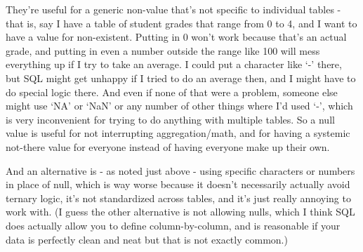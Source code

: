 \documentclass[11pt, oneside]{amsart}   	%
\begin{document}
They're useful for a generic non-value that's not specific to individual tables - that is, say I have a table of student grades that range from 0 to 4, and I want to have a value for non-existent. Putting in 0 won't work because that's an actual grade, and putting in even a number outside the range like 100 will mess everything up if I try to take an average. I could put a character like `-' there, but SQL might get unhappy if I tried to do an average then, and I might have to do special logic there. And even if none of that were a problem, someone else might use `NA' or `NaN' or any number of other things where I'd used `-', which is very inconvenient for trying to do anything with multiple tables. So a null value is useful for not interrupting aggregation/math, and for having a systemic not-there value for everyone instead of having everyone make up their own. 

And an alternative is - as noted just above - using specific characters or numbers in place of null, which is way worse because it doesn't necessarily actually avoid ternary logic, it's not standardized across tables, and it's just really annoying to work with. (I guess the other alternative is not allowing nulls, which I think SQL does actually allow you to define column-by-column, and is reasonable if your data is perfectly clean and neat but that is not exactly common.) 
\end{document}
